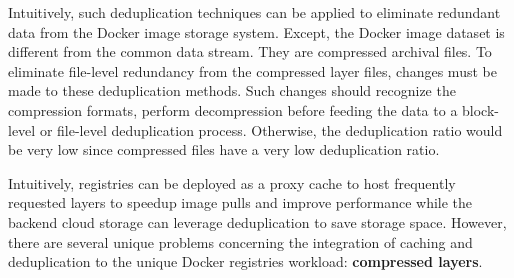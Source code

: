 

Intuitively, such deduplication techniques can be applied to eliminate redundant data from the Docker image storage system.  
Except, the Docker image dataset is different from the common data stream. 
They are compressed archival files.
To eliminate file-level redundancy from the compressed layer files, changes must be made to these deduplication methods. 
Such changes should recognize the compression formats, perform decompression before feeding the data to a block-level or file-level deduplication process. 
Otherwise, the deduplication ratio would be very low since compressed files have a very low deduplication ratio. 

Intuitively, registries can be deployed as a proxy cache to host frequently requested layers to speedup image pulls and improve performance 
while the backend cloud storage can leverage deduplication to save storage space.
However, there are several unique problems concerning the integration of caching and deduplication to the unique Docker registries workload: \textbf{compressed layers}. 
